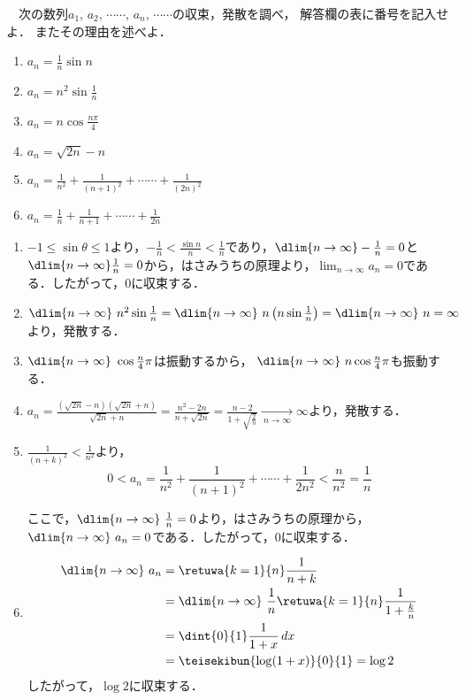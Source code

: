 \begin{problem}
  　次の数列$a_1, \, a_2, \, \cdots\cdots, \, a_n, \, \cdots\cdots$の収束，発散を調べ，
解答欄の表に番号を記入せよ．
またその理由を述べよ．
\begin{enumerate}
\item $\displaystyle a_n=\frac{1}{n}\sin n$
\item $\displaystyle a_n=n^2\sin\frac{1}{n}$
\item $\displaystyle a_n=n\cos\frac{n\pi}{4}$
\item $a_n=\sqrt{2n}-n$
\item $\displaystyle a_n=\frac{1}{n^2}+\frac{1}{{(n+1)}^2}+\cdots\cdots+\frac{1}{{(2n)}^2}$
\item $\displaystyle a_n=\frac{1}{n}+\frac{1}{n+1}+\cdots\cdots+\frac{1}{2n}$
\end{enumerate}
\end{problem}


\begin{enumerate}
  \item $-1 \leq \sin\theta \leq 1$より，$-\frac{1}{n} < \frac{\sin n}{n} < \frac{1}{n}$であり，$\dlim{n \to \infty} -\frac{1}{n} = 0$と$\dlim{n \to \infty} \frac{1}{n} = 0$から，はさみうちの原理より，$\lim_{n\to\infty}a_n = 0$である．したがって，$0$に収束する．

  \item
  $\dlim{n \to \infty}\ n^2 \sin \frac{1}{n}
    = \dlim{n \to \infty}\ n\left(n\sin \frac{1}{n}\right)
    = \dlim{n \to \infty}\ n
    = \infty$
  より，発散する．

  \item $\dlim{n \to \infty}\ \cos\frac{n}{4}\pi$は振動するから，
  $\dlim{n\to\infty}\ n\cos\frac{n}{4}\pi$も振動する．

  \item $a_n = \frac{(\sqrt{2n}-n)(\sqrt{2n}+n)}{\sqrt{2n}+n}
  = \frac{n^2-2n}{n+\sqrt{2n}}=\frac{n-2}{1+\sqrt{\frac{2}{n}}}\underset{\ n \to \infty\ }{\longrightarrow} \infty$より，発散する．

  \item $\frac{1}{(n+k)^2} < \frac{1}{n^2}$より，
  \[0 < a_n = \frac{1}{n^2} + \frac{1}{(n+1)^2} + \cdots\cdots + \frac{1}{2n^2} < \frac{n}{n^2} = \frac{1}{n}\]

  ここで，$\dlim{n\to\infty}\ \frac{1}{n} = 0$より，はさみうちの原理から，
  $\dlim{n\to\infty}\ a_n = 0$である．したがって，0に収束する．

  \item
  \begin{align*}
    \dlim{n\to\infty}\ a_n &= \retuwa{k=1}{n}\frac{1}{n+k} \\
    &= \dlim{n\to\infty}\ \frac{1}{n} \retuwa{k=1}{n}\frac{1}{1+\frac{k}{n}}\\
    &= \dint{0}{1}\frac{1}{1+x}\, dx\\
    &= \teisekibun{\log (1+x)}{0}{1} = \log 2
  \end{align*}
  したがって，$\log 2$に収束する．
\end{enumerate}
